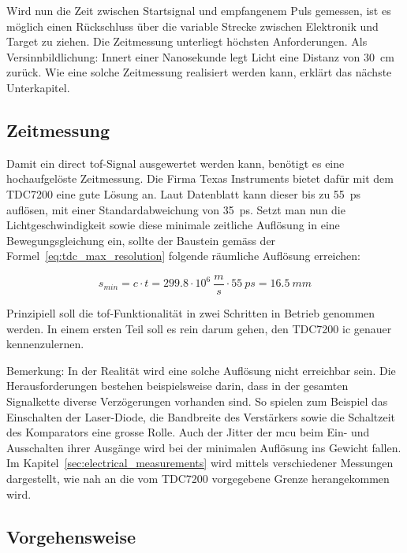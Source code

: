 Wird nun die Zeit zwischen Startsignal und empfangenem Puls gemessen, ist es möglich einen Rückschluss über die variable
Strecke zwischen Elektronik und Target zu ziehen. Die Zeitmessung unterliegt höchsten Anforderungen. Als
Versinnbildlichung: Innert einer Nanosekunde legt Licht eine Distanz von 30~cm zurück. Wie eine solche Zeitmessung
realisiert werden kann, erklärt das nächste Unterkapitel.

\subsection{Zeitmessung}

Damit ein direct \acrshort{tof}-Signal ausgewertet werden kann, benötigt es eine hochaufgelöste
Zeitmessung. Die Firma Texas Instruments bietet dafür mit dem TDC7200 eine gute Lösung
an. Laut Datenblatt \cite{ti2016tdc7200_datasheet} kann dieser bis zu 55~ps auflösen, mit einer
Standardabweichung von 35~ps. Setzt man nun die Lichtgeschwindigkeit sowie diese minimale
zeitliche Auflösung in eine Bewegungsgleichung ein, sollte der Baustein gemäss der Formel~\ref{eq:tdc_max_resolution}
folgende räumliche Auflösung erreichen:

\begin{equation}\label{eq:tdc_max_resolution}
        s_{min} = c \cdot t = 299.8 \cdot 10^6~\frac{m}{s} \cdot 55~ps = 16.5~mm
\end{equation}

Prinzipiell soll die \acrshort{tof}-Funktionalität in zwei Schritten in Betrieb genommen werden.
In einem ersten Teil soll es rein darum gehen, den TDC7200 \acrshort{ic} genauer
kennenzulernen.

Bemerkung: In der Realität wird eine solche Auflösung nicht erreichbar sein. Die Herausforderungen
bestehen beispielsweise darin, dass in der gesamten Signalkette diverse Verzögerungen vorhanden sind.
So spielen zum Beispiel das Einschalten der Laser-Diode, die Bandbreite des Verstärkers sowie
die Schaltzeit des Komparators eine grosse Rolle. Auch der Jitter der \acrshort{mcu} beim Ein- und Ausschalten
ihrer Ausgänge wird bei der minimalen Auflösung ins Gewicht fallen. Im Kapitel~\ref{sec:electrical_measurements}
wird mittels verschiedener Messungen dargestellt, wie nah an die vom TDC7200 vorgegebene Grenze herangekommen wird.

\subsection{Vorgehensweise}\label{sec:approach}

